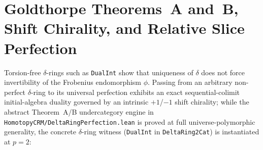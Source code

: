 \documentclass[10pt,twoside,openright]{book}
\theoremstyle{crmplain}
\theoremstyle{crmdef}
\theoremstyle{crmremark}
\begin{document}
\section{\texorpdfstring{Goldthorpe Theorems~A and~B, Shift Chirality, and Relative Slice Perfection}{Goldthorpe Theorems A and B, Shift Chirality, and Relative Slice Perfection}}\label{sec:slice-perfection}

Torsion-free $\delta$-rings such as \texttt{DualInt} show that uniqueness of $\delta$ does not force invertibility of the Frobenius endomorphism $\phi$. Passing from an arbitrary non-perfect $\delta$-ring to its universal perfection exhibits an exact sequential-colimit initial-algebra duality governed by an intrinsic $+1$/$-1$ shift chirality; while the abstract Theorem~A/B undercategory engine in \texttt{HomotopyCRM/\allowbreak DeltaRingPerfection.lean} is proved at full universe-polymorphic generality, the concrete $\delta$-ring witness (\texttt{DualInt} in \texttt{DeltaRing2Cat}) is instantiated at $p = 2$:
\end{document}
